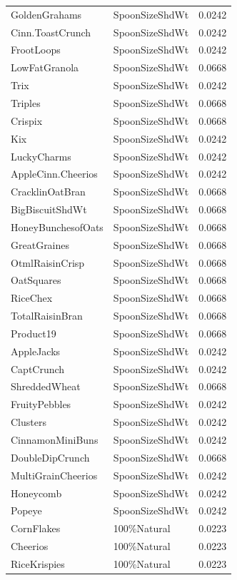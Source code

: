 \begin{table}[!htbp]
\begin{tabular}{lll}
\\
GoldenGrahams & SpoonSizeShdWt & 0.0242
\\
Cinn.ToastCrunch & SpoonSizeShdWt & 0.0242
\\
FrootLoops & SpoonSizeShdWt & 0.0242
\\
LowFatGranola & SpoonSizeShdWt & 0.0668
\\
Trix & SpoonSizeShdWt & 0.0242
\\
Triples & SpoonSizeShdWt & 0.0668
\\
Crispix & SpoonSizeShdWt & 0.0668
\\
Kix & SpoonSizeShdWt & 0.0242
\\
LuckyCharms & SpoonSizeShdWt & 0.0242
\\
AppleCinn.Cheerios & SpoonSizeShdWt & 0.0242
\\
CracklinOatBran & SpoonSizeShdWt & 0.0668
\\
BigBiscuitShdWt & SpoonSizeShdWt & 0.0668
\\
HoneyBunchesofOats & SpoonSizeShdWt & 0.0668
\\
GreatGraines & SpoonSizeShdWt & 0.0668
\\
OtmlRaisinCrisp & SpoonSizeShdWt & 0.0668
\\
OatSquares & SpoonSizeShdWt & 0.0668
\\
RiceChex & SpoonSizeShdWt & 0.0668
\\
TotalRaisinBran & SpoonSizeShdWt & 0.0668
\\
Product19 & SpoonSizeShdWt & 0.0668
\\
AppleJacks & SpoonSizeShdWt & 0.0242
\\
CaptCrunch & SpoonSizeShdWt & 0.0242
\\
ShreddedWheat & SpoonSizeShdWt & 0.0668
\\
FruityPebbles & SpoonSizeShdWt & 0.0242
\\
Clusters & SpoonSizeShdWt & 0.0242
\\
CinnamonMiniBuns & SpoonSizeShdWt & 0.0242
\\
DoubleDipCrunch & SpoonSizeShdWt & 0.0668
\\
MultiGrainCheerios & SpoonSizeShdWt & 0.0242
\\
Honeycomb & SpoonSizeShdWt & 0.0242
\\
Popeye & SpoonSizeShdWt & 0.0242
\\
CornFlakes & 100\%Natural & 0.0223
\\
Cheerios & 100\%Natural & 0.0223
\\
RiceKrispies & 100\%Natural & 0.0223

\end{tabular}
\end{table}
